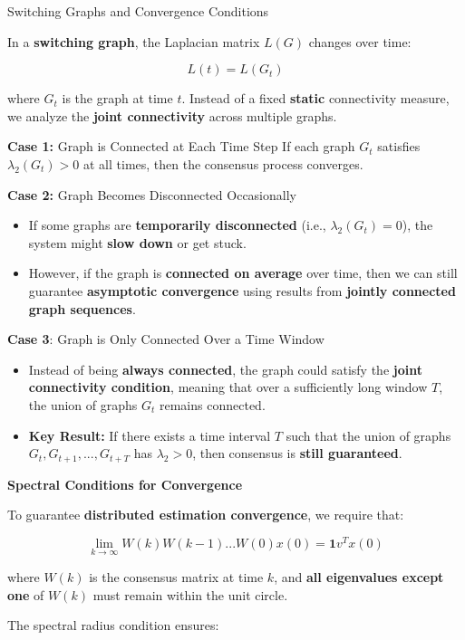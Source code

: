 \documentclass[letterpaper, 10pt, conference]{ieeeconf}  %
\begin{document}
{Switching Graphs and Convergence Conditions}

In a \textbf{switching graph}, the Laplacian matrix \( L(G) \) changes over time:

\[
L(t) = L(G_t)
\]

where \( G_t \) is the graph at time \( t \). Instead of a fixed \textbf{static} connectivity measure, we analyze the \textbf{joint connectivity} across multiple graphs.

\textbf{Case 1:} Graph is Connected at Each Time Step
If each graph \( G_t \) satisfies \( \lambda_2(G_t) > 0 \) at all times, then the consensus process converges.

\textbf{Case 2:} Graph Becomes Disconnected Occasionally
\begin{itemize}
    \item If some graphs are \textbf{temporarily disconnected} (i.e., \( \lambda_2(G_t) = 0 \)), the system might \textbf{slow down} or get stuck.
    \item However, if the graph is \textbf{connected on average} over time, then we can still guarantee \textbf{asymptotic convergence} using results from \textbf{jointly connected graph sequences}.
\end{itemize}

\textbf{Case 3}: Graph is Only Connected Over a Time Window
\begin{itemize}
    \item Instead of being \textbf{always connected}, the graph could satisfy the \textbf{joint connectivity condition}, meaning that over a sufficiently long window \( T \), the union of graphs \( G_t \) remains connected.
    \item \textbf{Key Result:} If there exists a time interval \( T \) such that the union of graphs \( G_{t}, G_{t+1}, ..., G_{t+T} \) has \( \lambda_2 > 0 \), then consensus is \textbf{still guaranteed}.
\end{itemize}

\textbf{Spectral Conditions for Convergence}

To guarantee \textbf{distributed estimation convergence}, we require that:

\[
\lim_{k \to \infty} W(k) W(k-1) ... W(0) x(0) = \mathbf{1} v^T x(0)
\]

where \( W(k) \) is the consensus matrix at time \( k \), and \textbf{all eigenvalues except one} of \( W(k) \) must remain within the unit circle.

The spectral radius condition ensures:
\end{document}
